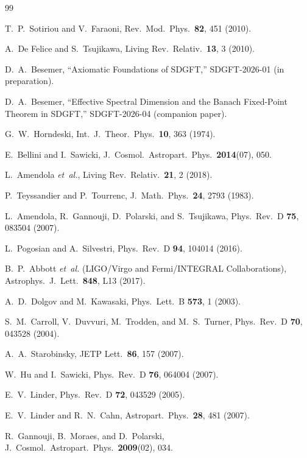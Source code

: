 \documentclass[amsmath,amssymb,aps,prd,twocolumn,superscriptaddress,nofootinbib]{revtex4-2}
\begin{document}
\begin{thebibliography}{99}

T.~P.~Sotiriou and V.~Faraoni,
Rev.\ Mod.\ Phys.\ \textbf{82}, 451 (2010).

A.~De Felice and S.~Tsujikawa,
Living Rev.\ Relativ.\ \textbf{13}, 3 (2010).

D.~A.~Besemer, ``Axiomatic Foundations of SDGFT,''
SDGFT-2026-01 (in preparation).

D.~A.~Besemer, ``Effective Spectral Dimension and the Banach
Fixed-Point Theorem in SDGFT,''
SDGFT-2026-04 (companion paper).

G.~W.~Horndeski,
Int.\ J.\ Theor.\ Phys.\ \textbf{10}, 363 (1974).

E.~Bellini and I.~Sawicki,
J.\ Cosmol.\ Astropart.\ Phys.\ \textbf{2014}(07), 050.

L.~Amendola {\it et~al.},
Living Rev.\ Relativ.\ \textbf{21}, 2 (2018).

P.~Teyssandier and P.~Tourrenc,
J.\ Math.\ Phys.\ \textbf{24}, 2793 (1983).

L.~Amendola, R.~Gannouji, D.~Polarski, and S.~Tsujikawa,
Phys.\ Rev.\ D \textbf{75}, 083504 (2007).

L.~Pogosian and A.~Silvestri,
Phys.\ Rev.\ D \textbf{94}, 104014 (2016).

B.~P.~Abbott {\it et~al.} (LIGO/Virgo and Fermi/INTEGRAL
Collaborations),
Astrophys.\ J.\ Lett.\ \textbf{848}, L13 (2017).

A.~D.~Dolgov and M.~Kawasaki,
Phys.\ Lett.\ B \textbf{573}, 1 (2003).

S.~M.~Carroll, V.~Duvvuri, M.~Trodden, and M.~S.~Turner,
Phys.\ Rev.\ D \textbf{70}, 043528 (2004).

A.~A.~Starobinsky,
JETP Lett.\ \textbf{86}, 157 (2007).

W.~Hu and I.~Sawicki,
Phys.\ Rev.\ D \textbf{76}, 064004 (2007).

E.~V.~Linder,
Phys.\ Rev.\ D \textbf{72}, 043529 (2005).

E.~V.~Linder and R.~N.~Cahn,
Astropart.\ Phys.\ \textbf{28}, 481 (2007).

R.~Gannouji, B.~Moraes, and D.~Polarski,
J.\ Cosmol.\ Astropart.\ Phys.\ \textbf{2009}(02), 034.


\end{thebibliography}
\end{document}
